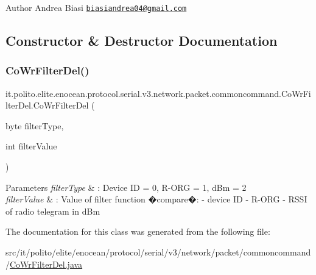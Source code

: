 \begin{DoxyAuthor}{Author}
Andrea Biasi \href{mailto:biasiandrea04@gmail.com}{\tt biasiandrea04@gmail.\+com} 
\end{DoxyAuthor}


\subsection{Constructor \& Destructor Documentation}
\hypertarget{classit_1_1polito_1_1elite_1_1enocean_1_1protocol_1_1serial_1_1v3_1_1network_1_1packet_1_1commoncommand_1_1_co_wr_filter_del_af9d4bde2c1965b4001f9b758cc665a56}{}\label{classit_1_1polito_1_1elite_1_1enocean_1_1protocol_1_1serial_1_1v3_1_1network_1_1packet_1_1commoncommand_1_1_co_wr_filter_del_af9d4bde2c1965b4001f9b758cc665a56} 
\subsubsection{\texorpdfstring{Co\+Wr\+Filter\+Del()}{CoWrFilterDel()}}
{\footnotesize\ttfamily it.\+polito.\+elite.\+enocean.\+protocol.\+serial.\+v3.\+network.\+packet.\+commoncommand.\+Co\+Wr\+Filter\+Del.\+Co\+Wr\+Filter\+Del (\begin{DoxyParamCaption}\item[{byte}]{filter\+Type,  }\item[{int}]{filter\+Value }\end{DoxyParamCaption})}


\begin{DoxyParams}{Parameters}
{\em filter\+Type} & \+: Device ID = 0, R-\/\+O\+RG = 1, d\+Bm = 2 \\
\hline
{\em filter\+Value} & \+: Value of filter function �compare�\+: -\/ device ID -\/ R-\/\+O\+RG -\/ R\+S\+SI of radio telegram in d\+Bm \\
\hline
\end{DoxyParams}


The documentation for this class was generated from the following file\+:\begin{DoxyCompactItemize}
\item 
src/it/polito/elite/enocean/protocol/serial/v3/network/packet/commoncommand/\hyperlink{_co_wr_filter_del_8java}{Co\+Wr\+Filter\+Del.\+java}\end{DoxyCompactItemize}
